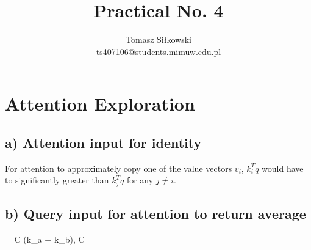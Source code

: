 \documentclass[12pt]{article}
\def\[#1\]{\begin{align*}#1\end{align*}}
\begin{document}
 
 
\title{Practical No. 4 }%
\author{Tomasz Siłkowski\\ %
ts407106@students.mimuw.edu.pl}
 
\maketitle

\setcounter{section}{1}
\section{Attention Exploration}
\subsection*{a) Attention input for identity}
For attention to approximately copy one of the value vectors \(v_i\), \(k^T_i q\)
would have to significantly greater than \(k^T_j q\) for any \(j \neq i\).

\medskip

\subsection*{b) Query input for attention to return average }
\[
q = C (k_a + k_b),  C 
\]

\medskip
\end{document}
